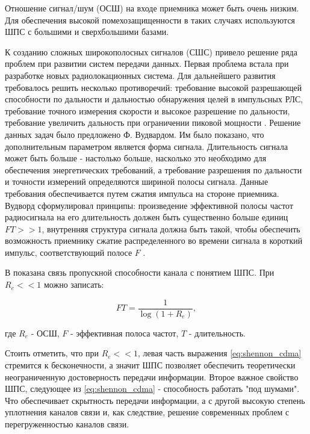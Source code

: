 Отношение сигнал/шум (ОСШ) на входе приемника может быть очень низким. Для обеспечения высокой помехозащищенности 
в таких случаях используются ШПС с большими и сверхбольшими базами.

К созданию сложных широкополосных сигналов (СШС) привело решение ряда проблем при развитии систем передачи данных.
Первая проблема встала при разработке новых радиолокационных система. Для дальнейшего развития требовалось
решить несколько противоречий: требование высокой разрешающей способности по дальности и дальностью обнаружения
целей в импульсных РЛС, требование точного измерения скорости и высокое разрешение по дальности, требование
увеличить дальность при ограничении пиковой мощности \cite{gantmaher-book}. Решение данных задач было предложено
Ф. Вудвардом. Им было показано, что дополнительным параметром является форма сигнала. Длительность сигнала
может быть больше - настолько больше, насколько это необходимо для обеспечения энергетических требований, а требование
разрешения по дальности и точности измерений определяются шириной полосы сигнала. Данные требования обеспечивается
путем сжатия импульса на стороне приемника. Вудворд сформулировал принципы: произведение эффективной полосы частот
радиосигнала на его длительность должен быть существенно больше единиц ${FT>>1}$, внутренняя структура сигнала
должна быть такой, чтобы обеспечить возможность приемнику сжатие распределенного во времени сигнала в короткий импульс,
соответствующий полосе ${F}$ \cite{gantmaher-book}.

В \cite{gantmaher-book} показана связь пропускной способности канала с понятием ШПС. При ${R_e<<1}$ можно записать:
\begin{center}
\begin{equation}
	\label{eq:shennon_cdma}
	FT = \frac{1}{\log(1+R_e)},
\end{equation}
\end{center}
где ${R_e}$ - ОСШ, ${F}$ - эффективная полоса частот, ${T}$ - длительность.

Стоить отметить, что при ${R_e<<1}$, левая часть выражения \ref{eq:shennon_cdma} стремится к бесконечности, а значит
ШПС позволяет обеспечить теоретически неограниченную достоверность передачи информации. Второе важное свойство
ШПС, следующее из \ref{eq:shennon_cdma} - способность работать "под шумами". Что обеспечивает скрытность
передачи информации, а с другой высокую степень уплотнения каналов связи и, как следствие, решение современных проблем
с перегруженностью каналов связи.

